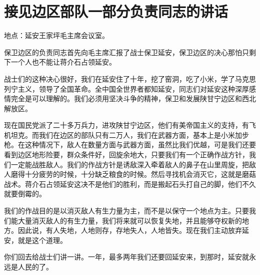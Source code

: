 \section[接见边区部队一部分负责同志的讲话（一九四七年三月十六日）]{接见边区部队一部分负责同志的讲话}


地点：延安王家坪毛主席会议室。

保卫边区的负责同志首先向毛主席汇报了战士保卫延安，保卫边区的决心那怕只剩下一个人也不能让蒋介石占领延安。

战士们的这种决心很好，我们在延安住了十年，挖了窑洞，吃了小米，学了马克思列宁主义，领导了全国革命。全中国全世界者都知延安，同志们对延安这种深厚感情完全是可以理解的。我们必须用坚决斗争的精神，保卫和发展陕甘宁边区和西北解放区。

现在国民党派了二十多万兵力，进攻陕甘宁边区，他们有美帝国主义的支持，有飞机坦克。而我们在边区的部队只有二万人，我们在武器方面，基本上是小米加步枪。在这种情况下，敌人在数量方面与武器方面，虽然比我们优越，可是我们还要看到边区地形险要，群众条件好，回旋余地大，只要我们有一个正确作战方针，我们一定能战胜敌人。我们的作战方针是诱敌深入牵着敌人的鼻子在山里周旋，把敌人磨得十分疲劳的时候，十分缺乏粮食的时候。然后寻找机会消灭它，这就是磨菇战术。蒋介石占领延安这决不是他们的胜利，而是搬起石头打自己的脚，他们不久就要倒霉的。

我们的作战目的是以消灭敌人有生力量为主，而不是以保守一个地点为主。只要我们能大量消灭敌人的有生力量，我们将来就可以恢复失地，并且能够夺权新的地方。因此说，有人失地，人地则存，存地失人，人地皆失。现在我们主动放弃延安，就是这个道理。

你们回去给战士们讲一讲。一年，最多两年我们还要回延安来，到那时，延安就永远是人民的了。

